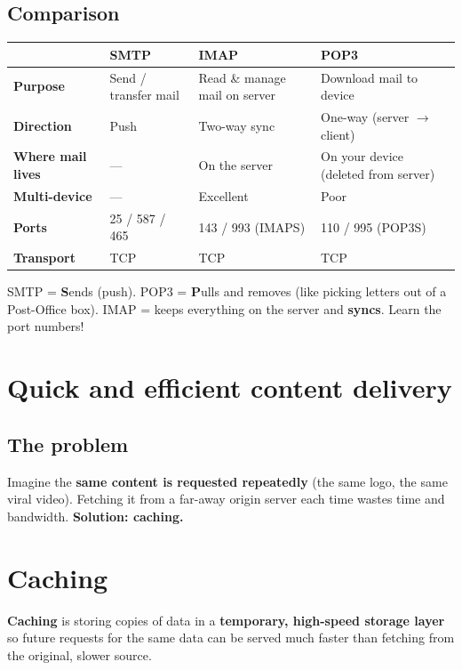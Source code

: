 \subsection{Comparison}
\begin{center}
\begin{tabularx}{\textwidth}{>{\bfseries}l X X X}
\toprule
 & SMTP & IMAP & POP3 \\
\midrule
Purpose & Send / transfer mail & Read \& manage mail on server & Download mail to device \\
Direction & Push & Two-way sync & One-way (server $\to$ client) \\
Where mail lives & --- & On the server & On your device (deleted from server) \\
Multi-device & --- & Excellent & Poor \\
Ports & 25 / 587 / 465 & 143 / 993 (IMAPS) & 110 / 995 (POP3S) \\
Transport & TCP & TCP & TCP \\
\bottomrule
\end{tabularx}
\end{center}

\begin{examtip}
SMTP = \textbf{S}ends (push). POP3 = \textbf{P}ulls and removes (like picking letters out of a Post-Office box). IMAP = keeps everything on the server and \textbf{syncs}. Learn the port numbers!
\end{examtip}

\section{Quick and efficient content delivery}

\subsection{The problem}
Imagine the \textbf{same content is requested repeatedly} (the same logo, the same viral video). Fetching it from a far-away origin server each time wastes time and bandwidth. \textbf{Solution: caching.}

\section{Caching}
\textbf{Caching} is storing copies of data in a \textbf{temporary, high-speed storage layer} so future requests for the same data can be served much faster than fetching from the original, slower source.

